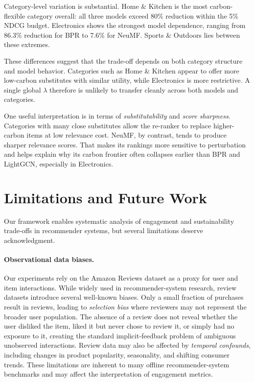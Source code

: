 \documentclass[11pt]{article}
\begin{document}
Category-level variation is substantial. Home \& Kitchen is the most carbon-flexible
category overall: all three models exceed 80\% reduction within the 5\% NDCG budget.
Electronics shows the strongest model dependence, ranging from 86.3\% reduction for BPR to
7.6\% for NeuMF. Sports \& Outdoors lies between these extremes.

These differences suggest that the trade-off depends on both category structure and model
behavior. Categories such as Home \& Kitchen appear to offer more low-carbon substitutes
with similar utility, while Electronics is more restrictive. A single global $\lambda$
therefore is unlikely to transfer cleanly across both models and categories.

One useful interpretation is in terms of \emph{substitutability} and \emph{score
sharpness}. Categories with many close substitutes allow the re-ranker to replace
higher-carbon items at low relevance cost. NeuMF, by contrast, tends to produce sharper
relevance scores. That makes its rankings more sensitive to perturbation and helps explain
why its carbon frontier often collapses earlier than BPR and LightGCN, especially in
Electronics.


\section{Limitations and Future Work}\label{sec:limitations}
Our framework enables systematic analysis of engagement and sustainability trade-offs in
recommender systems, but several limitations deserve acknowledgment.

\paragraph{Observational data biases.}
Our experiments rely on the Amazon Reviews dataset as a proxy for user and item
interactions. While widely used in recommender-system research, review datasets introduce
several well-known biases. Only a small fraction of purchases result in reviews, leading to
\emph{selection bias} where reviewers may not represent the broader user population. The
absence of a review does not reveal whether the user disliked the item, liked it but never
chose to review it, or simply had no exposure to it, creating the standard implicit-feedback
problem of ambiguous unobserved interactions. Review data may also be affected by \emph{temporal
confounds}, including changes in product popularity, seasonality, and shifting consumer
trends. These limitations are inherent to many offline recommender-system benchmarks and
may affect the interpretation of engagement metrics.
\end{document}
